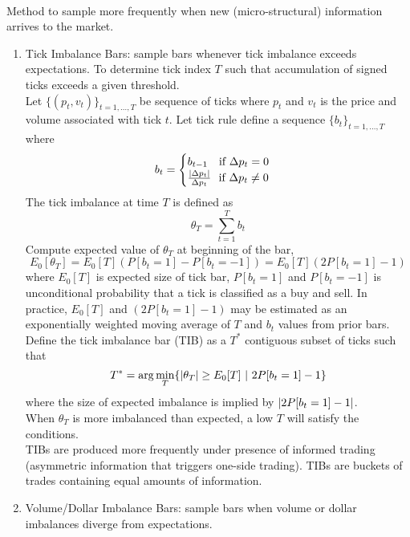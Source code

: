 \begin{remark} \\
Method to sample more frequently when new (micro-structural) information arrives to the market.
\begin{enumerate}[label=\roman*.]
\setlength{\itemsep}{0pt}
\item Tick Imbalance Bars: sample bars whenever tick imbalance exceeds expectations. To determine tick index $T$ such that accumulation of signed ticks exceeds a given threshold.\\
Let $\{(p_t, v_t)\}_{t=1, \ldots, T}$ be sequence of ticks where $p_t$ and $v_t$ is the price and volume associated with tick $t$. Let tick rule define a sequence $\{b_t\}_{t=1, \ldots, T}$ where
\begin{align}
b_t = 
\begin{cases}
b_{t-1} \ \ \ \text{if } \Delta p_t = 0 \\
\frac{\left\lvert\Delta p_t\right\rvert}{\Delta p_t} \ \ \text{if } \Delta p_t \neq 0
\end{cases} \nonumber
\end{align}
The tick imbalance at time $T$ is defined as 
\begin{equation}
\theta_T = \sum\limits_{t=1}^T b_t \nonumber
\end{equation}
Compute expected value of $\theta_T$ at beginning of the bar,
\begin{equation}
E_0[\theta_T] = E_0 [T](P[b_t = 1] - P[b_t = -1]) = E_0 [T](2P[b_t = 1] - 1) \nonumber
\end{equation}
where $E_0[T]$ is expected size of tick bar, $P[b_t = 1]$ and $P[b_t = -1]$ is unconditional probability that a tick is classified as a buy and sell. In practice, $E_0[T]$ and $(2P[b_t = 1] - 1)$ may be estimated as an exponentially weighted moving average of $T$ and $b_t$ values from prior bars.\\
Define the tick imbalance bar (TIB) as a $T^{*}$ contiguous subset of ticks such that
\begin{equation}
T^{*} = \arg \min_T \{ \left\lvert\theta_T\right\rvert \geq E_0 [T] \ \vert \ 2 P[b_t = 1] - 1 \} \nonumber
\end{equation}
where the size of expected imbalance is implied by $\left\lvert2 P[b_t = 1] - 1\right\rvert$.\\
When $\theta_T$ is more imbalanced than expected, a low $T$ will satisfy the conditions.\\
TIBs are produced more frequently under presence of informed trading (asymmetric information that triggers one-side trading). TIBs are buckets of trades containing equal amounts of information.
\item Volume/Dollar Imbalance Bars: sample bars when volume or dollar imbalances diverge from expectations.
\end{enumerate}
\end{remark}
